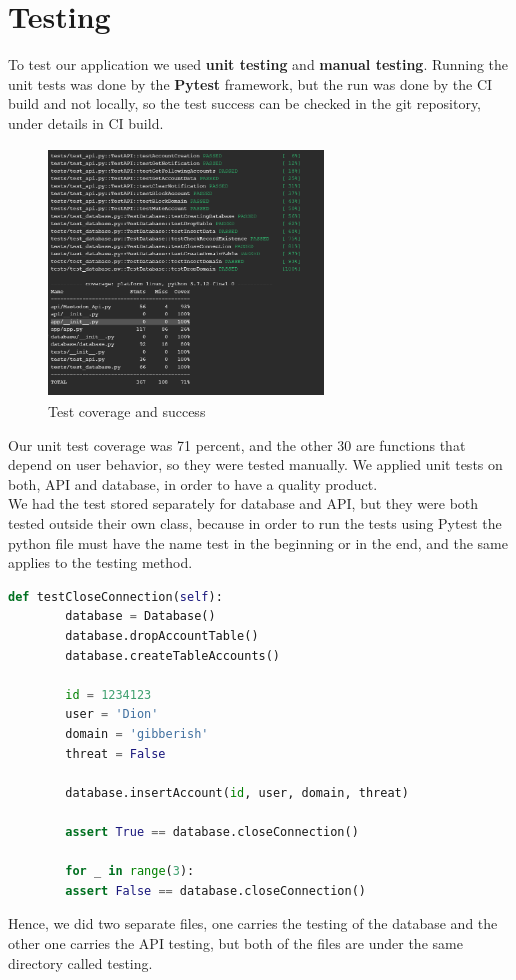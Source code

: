 \section{Testing}
To test our application we used \textbf{unit testing} and \textbf{manual testing}.
Running the unit tests was done by the \textbf{Pytest} \cite{pytest} framework, but the run was done by
the CI build and not locally, so the test success can be checked in the git repository, under
details in CI build.
\\[5pt]
\begin{figure}[H]
	\centering
	\includegraphics[width=0.65\textwidth,height=250px]{images/test_score.png}
	\caption{Test coverage and success}
	\label{fig:test_data}
\end{figure}
Our unit test coverage was 71 percent, and the other 30 are functions that depend on user behavior, so they were tested manually.
We applied unit tests on both, API and database, in order to have a quality product.
\\[5pt]
We had the test stored separately for database and API, but they were both tested outside their own class, because
in order to run the tests using Pytest the python file must have the name test in the beginning or in the end, and the
same applies to the testing method.
\begin{lstlisting}[language=python, caption={Testing a unit example}, captionpos=b]
 	def testCloseConnection(self):
		database = Database()
		database.dropAccountTable()
		database.createTableAccounts()

		id = 1234123
		user = 'Dion'
		domain = 'gibberish'
		threat = False

		database.insertAccount(id, user, domain, threat)

		assert True == database.closeConnection()

		for _ in range(3):
		assert False == database.closeConnection()
\end{lstlisting}
Hence, we did two separate files, one carries the testing of the database and the other one carries the API testing, but
both of the files are under the same directory called testing.
